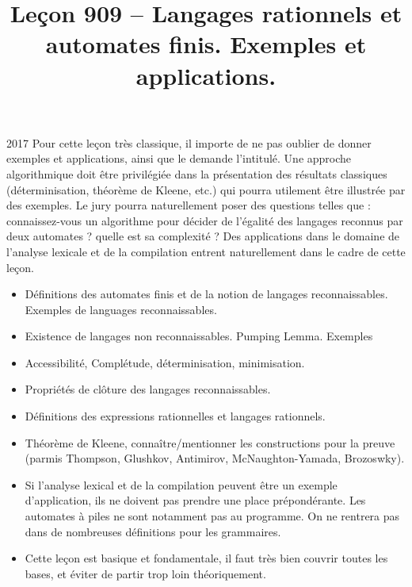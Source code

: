\documentclass{agregfiche}
\title{Leçon 909 -- Langages rationnels et automates finis.  Exemples et applications.}
\begin{document}
\maketitle

\secrapports

\begin{rapport}{2017}
Pour cette leçon très classique, il importe de ne pas oublier de donner exemples et applications, ainsi
que le demande l’intitulé.
Une approche algorithmique doit être privilégiée dans la présentation des résultats classiques (déterminisation, théorème de
Kleene, etc.) qui pourra utilement être illustrée par des exemples. Le jury pourra naturellement poser des questions telles que : connaissez-vous un algorithme pour décider de l’égalité des langages reconnus par deux automates ? quelle est sa complexité ?
Des applications dans le domaine de l’analyse lexicale et de la compilation entrent naturellement dans
le cadre de cette leçon.
\end{rapport}

\secindispensables

\begin{itemize}
\item  Définitions des automates finis et de la notion de langages reconnaissables. Exemples de languages reconnaissables.
\item Existence de langages non reconnaissables. Pumping Lemma. Exemples
\item Accessibilité, Complétude, déterminisation, minimisation.
\item Propriétés de clôture des langages reconnaissables. 
\item Définitions des expressions rationnelles et langages rationnels.
\item Théorème de Kleene, connaître/mentionner les constructions pour la preuve (parmis Thompson, Glushkov, Antimirov, McNaughton-Yamada, Brozoswky).
\end{itemize}

\secpieges

\begin{itemize}
\item Si l'analyse lexical et de la compilation peuvent être un exemple d'application, ils ne doivent pas prendre une place prépondérante. Les automates à piles ne sont notamment pas au programme. On ne rentrera pas dans de nombreuses définitions pour les grammaires.
\item Cette leçon est basique et fondamentale, il faut très bien couvrir toutes les bases, et éviter de partir trop loin théoriquement.
\end{itemize}
\end{document}

